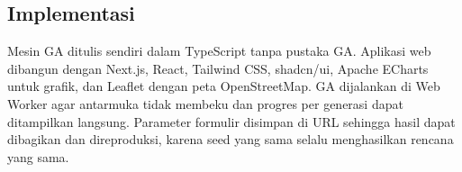 \subsection{Implementasi}
\label{sec:implementasi}

Mesin GA ditulis sendiri dalam TypeScript tanpa pustaka GA. Aplikasi web dibangun dengan Next.js, React, Tailwind CSS, shadcn/ui, Apache ECharts untuk grafik, dan Leaflet dengan peta OpenStreetMap. GA dijalankan di Web Worker agar antarmuka tidak membeku dan progres per generasi dapat ditampilkan langsung. Parameter formulir disimpan di URL sehingga hasil dapat dibagikan dan direproduksi, karena seed yang sama selalu menghasilkan rencana yang sama.
